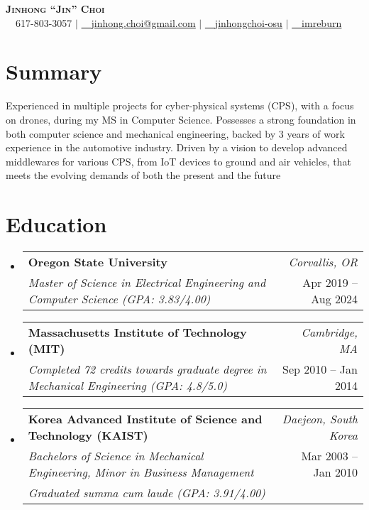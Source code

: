\documentclass[letterpaper,10pt]{article}
\makeatletter
\newcommand{\resumeSubheadingNew}[4]{
  \vspace{-2pt}\item
    \begin{tabular*}{0.97\textwidth}[t]{l@{\extracolsep{\fill}}r}
      \textbf{#1} & \textit{\small #2} \\
      \textit{\small#3} & \small #4 \\
    \end{tabular*}\vspace{-6pt}
}
\newcommand{\resumeSubheadingNewLine}[5]{
  \vspace{-2pt}\item
    \begin{tabular*}{0.97\textwidth}[t]{l@{\extracolsep{\fill}}r}
      \textbf{#1} & \textit{\small #2} \\
      \textit{\small#3} & \small #4 \\
      \textit{\small#5} & \\
    \end{tabular*}\vspace{-6pt}
}
\newcommand{\resumeSubHeadingListStart}{\begin{itemize}[leftmargin=0.15in, label={}]}
\newcommand{\resumeSubHeadingListEnd}{\end{itemize}}
\makeatother
\begin{document}

\begin{center}
    \textbf{\Huge \scshape Jinhong ``Jin'' Choi} \\ \vspace{5pt}
    \small \faMobile~~617-803-3057 $|$ \href{mailto:jinhong.choi@gmail.com}{\faEnvelope~~\underline{jinhong.choi@gmail.com}} $|$ 
    \href{https://linkedin.com/in/jinhongchoi-osu}{\faLinkedin~~\underline{jinhongchoi-osu}} $|$
    \href{https://github.com/imreburn}{\faGithub~~\underline{imreburn}}
\end{center}

\section{Summary}
\begin{itemize}[leftmargin=0.15in, label={}, rightmargin=0.15in]
\small{\item{Experienced in multiple projects for cyber-physical systems (CPS), with a focus on drones, during my MS in Computer Science. Possesses a strong foundation in both computer science and mechanical engineering, backed by 3 years of work experience in the automotive industry. Driven by a vision to develop advanced middlewares for various CPS, from IoT devices to ground and air vehicles, that meets the evolving demands of both the present and the future}}
\end{itemize}

\section{Education}
  \resumeSubHeadingListStart
    \resumeSubheadingNew
      {Oregon State University}{Corvallis, OR}
      {Master of Science in  Electrical Engineering and Computer Science (GPA: 3.83/4.00)}{Apr 2019 -- Aug 2024}
    \resumeSubheadingNew
      {Massachusetts Institute of Technology (MIT)}{Cambridge, MA}
      {Completed 72 credits towards graduate degree in Mechanical Engineering (GPA: 4.8/5.0)}{Sep 2010 -- Jan 2014}
    \resumeSubheadingNewLine
      {Korea Advanced Institute of Science and Technology (KAIST)}{Daejeon, South Korea}
      {Bachelors of Science in Mechanical Engineering, Minor in Business Management}{Mar 2003 -- Jan 2010}{Graduated summa cum laude (GPA: 3.91/4.00)}
  \resumeSubHeadingListEnd
\end{document}
